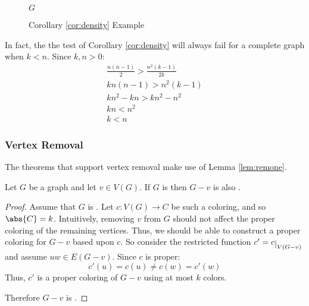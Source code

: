 \begin{figure}[h]
  \label{fig:density}
  \begin{center}

    \bigskip

    \(G\)
  \end{center}
  \caption{Corollary \ref{cor:density} Example}
\end{figure}

In fact, the the test of Corollary \ref{cor:density} will always fail for a complete graph when \(k<n\).  Since
\(k,n>0\):
\begin{gather*}
  \frac{n(n-1)}{2}>\frac{n^2(k-1)}{2k} \\
  kn(n-1)>n^2(k-1) \\
  kn^2-kn>kn^2-n^2 \\
  kn<n^2 \\
  k<n
\end{gather*}

\subsubsection{Vertex Removal}

The theorems that support vertex removal make use of Lemma \ref{lem:remone}.

\begin{lemma}
  \label{lem:remone}
  Let \(G\) be a graph and let \(v\in V(G)\).  If \(G\) is  then \(G-v\) is also .
\end{lemma}

\begin{proof}
  Assume that \(G\) is .  Let \(c:V(G)\to C\) be such a coloring, and so \(\abs{C}=k\).  Intuitively,
  removing \(v\) from \(G\) should not affect the proper coloring of the remaining vertices.  Thus, we should be
  able to construct a proper coloring for \(G-v\) based upon \(c\).  So consider the restricted function
  \(c'=\restrict{c}{V(G-v)}\) and assume \(uw\in E(G-v)\).  Since \(c\) is proper:
  \[c'(u)=c(u)\ne c(w)=c'(w)\]
  Thus, \(c'\) is a proper coloring of \(G-v\) using at most \(k\) colors.

  Therefore \(G-v\) is .
\end{proof}

